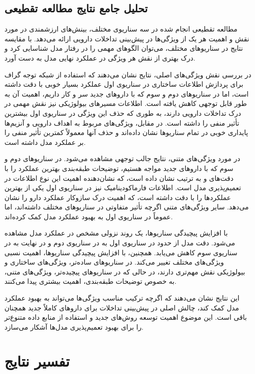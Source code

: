 \subsection{تحلیل جامع نتایج مطالعه تقطیعی}

مطالعه تقطیعی انجام شده در سه سناریوی مختلف، بینش‌های ارزشمندی در مورد نقش و اهمیت هر یک از ویژگی‌ها در پیش‌بینی تداخلات دارویی ارائه می‌دهد. با مقایسه نتایج در سناریوهای مختلف، می‌توان الگوهای مهمی را در رفتار مدل شناسایی کرد و درک بهتری از نقش هر ویژگی در عملکرد نهایی مدل به دست آورد.

در بررسی نقش ویژگی‌های اصلی، نتایج نشان می‌دهند که استفاده از شبکه توجه گراف برای پردازش اطلاعات ساختاری در سناریوی اول عملکرد بسیار خوبی با دقت  داشته است، اما در سناریوهای دوم و سوم که با داروهای جدید سر و کار داریم، اهمیت آن به طور قابل توجهی کاهش یافته است. اطلاعات مسیرهای بیولوژیکی نیز نقش مهمی در درک تداخلات دارویی دارند، به طوری که حذف این ویژگی در سناریوی اول بیشترین تأثیر منفی را داشته است. در مقابل، ویژگی‌های مربوط به اهداف دارویی و آنزیم‌ها پایداری خوبی در تمام سناریوها نشان داده‌اند و حذف آنها معمولاً کمترین تأثیر منفی را بر عملکرد مدل داشته است.

در مورد ویژگی‌های متنی، نتایج جالب توجهی مشاهده می‌شود. در سناریوهای دوم و سوم که با داروهای جدید مواجه هستیم، توضیحات طبقه‌بندی بهترین عملکرد را با دقت‌های  و  به ترتیب نشان داده است، که نشان‌دهنده اهمیت این نوع اطلاعات در تعمیم‌پذیری مدل است. اطلاعات فارماکودینامیک نیز در سناریوی اول یکی از بهترین عملکردها را با دقت  داشته است، که اهمیت درک سازوکار عملکرد دارو را نشان می‌دهد. سایر ویژگی‌های متنی اگرچه تأثیر متفاوتی در سناریوهای مختلف داشته‌اند، اما عموماً در سناریوی اول به بهبود عملکرد مدل کمک کرده‌اند.

با افزایش پیچیدگی سناریوها، یک روند نزولی مشخص در عملکرد مدل مشاهده می‌شود. دقت مدل از حدود  در سناریوی اول به  در سناریوی دوم و در نهایت به  در سناریوی سوم کاهش می‌یابد. همچنین، با افزایش پیچیدگی سناریوها، اهمیت نسبی ویژگی‌های مختلف تغییر می‌کند. در سناریوهای ساده‌تر، ویژگی‌های ساختاری و بیولوژیکی نقش مهم‌تری دارند، در حالی که در سناریوهای پیچیده‌تر، ویژگی‌های متنی، به خصوص توضیحات طبقه‌بندی، اهمیت بیشتری پیدا می‌کنند.

این نتایج نشان می‌دهند که اگرچه ترکیب مناسب ویژگی‌ها می‌تواند به بهبود عملکرد مدل کمک کند، چالش اصلی در پیش‌بینی تداخلات برای داروهای کاملاً جدید همچنان باقی است. این موضوع اهمیت توسعه روش‌های جدید و استفاده از منابع داده متنوع‌تر را برای بهبود تعمیم‌پذیری مدل‌ها آشکار می‌سازد.

\section{تفسیر نتایج}

